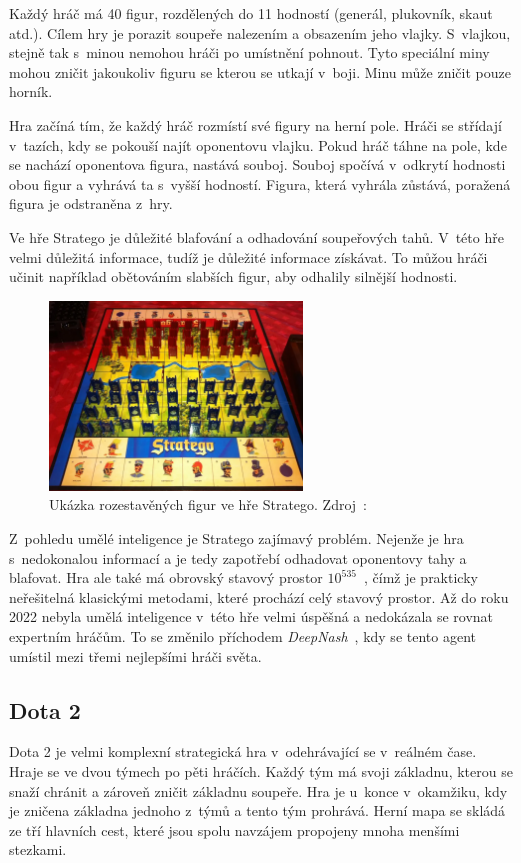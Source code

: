 Každý hráč má 40 figur, rozdělených do 11 hodností (generál, plukovník, skaut atd.).
Cílem hry je porazit soupeře nalezením a obsazením jeho vlajky.
S~vlajkou, stejně tak s~minou nemohou hráči po umístnění pohnout.
Tyto speciální miny mohou zničit jakoukoliv figuru se kterou se utkají v~boji.
Minu může zničit pouze horník.

Hra začíná tím, že každý hráč rozmístí své figury na herní pole.
Hráči se střídají v~tazích, kdy se pokouší najít oponentovu vlajku.
Pokud hráč táhne na pole, kde se nachází oponentova figura, nastává souboj.
Souboj spočívá v~odkrytí hodnosti obou figur a vyhrává ta s~vyšší hodností.
Figura, která vyhrála zůstává, poražená figura je odstraněna z~hry.

Ve hře Stratego je důležité blafování a odhadování soupeřových tahů.
V~této hře velmi důležitá informace, tudíž je důležité informace získávat.
To můžou hráči učinit například obětováním slabších figur, aby odhalily silnější hodnosti.

\begin{figure}[H]
	\centering
	\includegraphics[width=0.6\textwidth]{obrazky-figures/stratego}
	\caption{Ukázka rozestavěných figur ve hře Stratego.
  Zdroj~\cite{Stratego_image}:}\label{fig:figure2}
\end{figure}

Z~pohledu umělé inteligence je Stratego zajímavý problém.
Nejenže je hra s~nedokonalou informací a je tedy zapotřebí odhadovat oponentovy tahy a blafovat.
Hra ale také má obrovský stavový prostor $10^{535}$~\cite{Perolat_2022}, čímž je prakticky neřešitelná klasickými metodami, které prochází celý stavový prostor.
Až do roku 2022 nebyla umělá inteligence v~této hře velmi úspěšná a nedokázala se rovnat expertním hráčům.
To se změnilo příchodem \emph{DeepNash}~\cite{Perolat_2022}, kdy se tento agent umístil mezi třemi nejlepšími hráči světa.

\subsection{Dota 2}\label{subsec:dota}
Dota 2 je velmi komplexní strategická hra v~odehrávající se v~reálném čase.
Hraje se ve dvou týmech po pěti hráčích.
Každý tým má svoji základnu, kterou se snaží chránit a zároveň zničit základnu soupeře.
Hra je u~konce v~okamžiku, kdy je zničena základna jednoho z~týmů a tento tým prohrává.
Herní mapa se skládá ze tří hlavních cest, které jsou spolu navzájem propojeny mnoha menšími stezkami.


